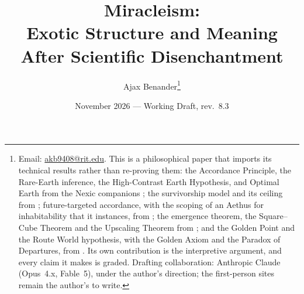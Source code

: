 \newcommand{\Gc}{\mathcal{G}}
\newcommand{\Ec}{\mathcal{E}}
\newcommand{\Mc}{\mathcal{M}}
\newcommand{\Sc}{\mathscr{S}}
\theoremstyle{plain}
\newtheorem{theorem}{Theorem}[section]
\newtheorem{proposition}[theorem]{Proposition}
\newtheorem{lemma}[theorem]{Lemma}
\newtheorem{corollary}[theorem]{Corollary}
\theoremstyle{definition}
\newtheorem{definition}[theorem]{Definition}
\newtheorem{premise}{Premise}
\newtheorem{hypothesis}[theorem]{Hypothesis}
\theoremstyle{remark}
\newtheorem{remark}[theorem]{Remark}
\title{Miracleism:\\ \large Exotic Structure and Meaning After Scientific Disenchantment}
\author{Ajax Benander\thanks{Email:
\href{mailto:akb9408@rit.edu}{akb9408@rit.edu}. This is a philosophical
paper that imports its technical results rather than re-proving them:
the Accordance Principle, the Rare-Earth inference, the High-Contrast
Earth Hypothesis, and Optimal Earth from the Nexic companions
\cite{Nexus,AethusOptimalEarth}; the survivorship model and its ceiling from
\cite{GoldenSurvivorship}; future-targeted accordance, with the scoping of an
Aethus for inhabitability that it instances, from \cite{GoldenTargeted}; the
emergence theorem, the Square--Cube Theorem and the Upscaling Theorem from \cite{GoldenTechnoanatomy}; and the
Golden Point and the Route World hypothesis, with the Golden Axiom and the
Paradox of Departures, from \cite{GoldenRouteWorld}. Its
own contribution is the interpretive argument, and every claim it makes
is graded. Drafting collaboration: Anthropic Claude (Opus~4.x,
Fable~5), under the author's direction; the first-person sites remain
the author's to write.}}
\date{November 2026 --- Working Draft, rev.~8.3}

\maketitle

